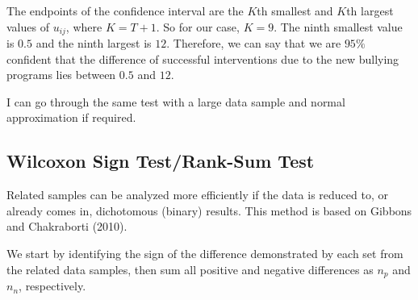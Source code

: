 The endpoints of the confidence interval are the $K$th smallest and $K$th largest values of $u_{ij}$, where $K = T + 1$. So for our case, $K = 9$. The ninth smallest value is $0.5$ and the ninth largest is $12$. Therefore, we can say that we are $95\%$ confident that the difference of successful interventions due to the new bullying programs lies between $0.5$ and $12$.

I can go through the same test with a large data sample and normal approximation if required.

\subsection{Wilcoxon Sign Test/Rank-Sum Test}

Related samples can be analyzed more efficiently if the data is reduced to, or already comes in, dichotomous (binary) results. This method is based on Gibbons and Chakraborti (2010).

We start by identifying the sign of the difference demonstrated by each set from the related data samples, then sum all positive and negative differences as $n_p$ and $n_n$, respectively. 

